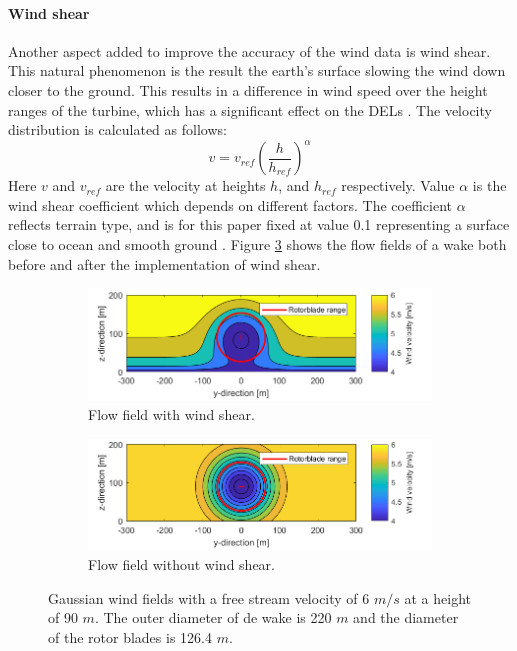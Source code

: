 \paragraph{Wind shear} \label{sec:windshear}
Another aspect added to improve the accuracy of the wind data is wind shear. This natural phenomenon is the result the earth's surface slowing the wind down closer to the ground. This results in a difference in wind speed over the height ranges of the turbine, which has a significant effect on the DELs \cite{Firtin2011}.  The velocity distribution is calculated as follows: 
\begin{equation}
\label{eq:shear}
v = v_{ref} \left(\frac{h}{h_{ref}}\right)^\alpha
\end{equation}
Here $v$ and $v_{ref}$ are the velocity at heights $h$, and $h_{ref}$  respectively. Value $\alpha$ is the wind shear coefficient which depends on different factors. The coefficient $\alpha$  reflects terrain type, and is for this paper fixed at value 0.1 representing a surface close to ocean and smooth ground \cite{Firtin2011}. Figure \ref{fig:windshear} shows the flow fields of a wake both before and after the implementation of wind shear.

\begin{figure}
	\centering
	\begin{subfigure}[b]{0.50\textwidth}
		\includegraphics[width=\linewidth]{./Figures/PlotwithshearU6D220.png} %
		\caption{Flow field with wind shear.}
		\label{fig:windsh}
	\end{subfigure}
	
	\begin{subfigure}[b]{0.50\textwidth}
		\includegraphics[width=\linewidth]{./Figures/PlotwithoutshearU6D220.png} %
		\caption{Flow field without wind shear.}
		\label{fig:nowindsh}
	\end{subfigure}
	
	\caption[Two Gaussian flow fields]{Gaussian wind fields with a free stream velocity of 6 $m/s$ at a height of 90 $m$. The outer diameter of de wake is 220 $m$ and the diameter of the rotor blades is 126.4 $m$.}
	\label{fig:windshear}
\end{figure}




